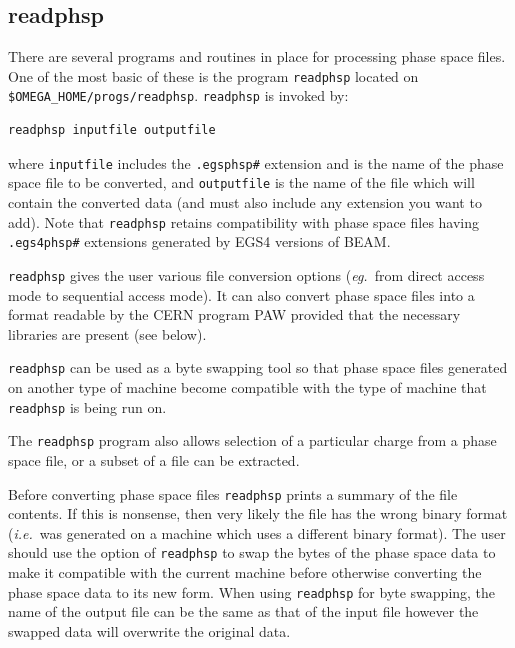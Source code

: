 \documentclass[12pt,twoside]{article}
\newcommand{\ie}{{\em i.e.}}
\newcommand{\eg}{{\em eg.}}
\begin{document}
\subsection{readphsp}
\label{readphspsect}
There are several programs and routines in place for processing phase
space files.  One of the most basic of these is the program \verb+readphsp+
located on \verb+$OMEGA_HOME/progs/readphsp+.
\verb+readphsp+ is invoked by:
\begin{verbatim}
readphsp inputfile outputfile
\end{verbatim}
where \verb+inputfile+ includes the \verb+.egsphsp#+ extension and
is the name of the phase space file to be converted, and
\verb+outputfile+ is the name of the file which will contain the
converted data (and must also include any extension you want
to add).
Note that {\tt readphsp} retains compatibility with phase space files having
{\tt .egs4phsp\#} extensions generated by EGS4 versions of BEAM.

\verb+readphsp+ gives the user various file conversion options (\eg\
from direct access mode to sequential access mode).  It can also convert
\index{PAW}
phase space files into a format readable by the CERN program PAW provided
that the necessary libraries are present (see below).

\verb+readphsp+ can be used as a byte swapping tool so that phase
space files generated on another type of machine become compatible with
the type of machine that \verb+readphsp+ is being run on.

The \verb+readphsp+ program also allows selection of a particular charge
from a phase space file, or a subset of a file can be extracted.

Before converting phase space files \verb+readphsp+ prints a summary of
the file contents.  If this is nonsense, then very likely the file has
the wrong binary format  (\ie\ was generated on a machine which uses a
different binary format). The user should use the option of
\verb+readphsp+ to swap the bytes of the phase space data to make it
compatible with the current machine before otherwise converting the phase
space data to its new form.  When using  \verb+readphsp+ for byte
swapping, the name of the output file can be the same as that of the input
file however the swapped data will overwrite the original data.
\end{document}
